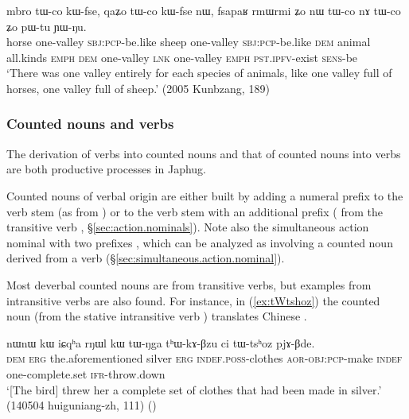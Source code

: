  \begin{exe}
\ex \label{ex:mbro.tWco}
 \gll  mbro tɯ-co kɯ-fse, qaʑo tɯ-co kɯ-fse nɯ, fsapaʁ rmɯrmi ʑo nɯ tɯ-co nɤ tɯ-co ʑo pɯ-tu ɲɯ-ŋu. \\
 horse one-valley \textsc{sbj}:\textsc{pcp}-be.like  sheep one-valley \textsc{sbj}:\textsc{pcp}-be.like \textsc{dem} animal all.kinds \textsc{emph} \textsc{dem}  one-valley \textsc{lnk}  one-valley \textsc{emph} \textsc{pst}.\textsc{ipfv}-exist \textsc{sens}-be \\
 \glt `There was one valley entirely for each species of animals, like one valley full of horses, one valley full of sheep.' (2005 Kunbzang, 189)
 \end{exe}
 
\subsubsection{Counted nouns and verbs}   \label{sec:CN.verbs}
The derivation of verbs into counted nouns and that of counted nouns into verbs are both productive processes in Japhug. 

Counted nouns of verbal origin are either built by adding a numeral prefix to the verb stem (as  from ) or to the verb stem with an additional prefix  ( from the transitive verb , §\ref{sec:action.nominals}). Note also the simultaneous action nominal with two prefixes , which can be analyzed as involving a counted noun derived from a verb (§\ref{sec:simultaneous.action.nominal}). 

Most deverbal counted nouns are from transitive verbs, but examples from intransitive verbs are also found. For instance, in (\ref{ex:tWtshoz}) the counted noun  (from the stative intransitive verb ) translates Chinese .

\begin{exe}
\ex \label{ex:tWtshoz}
\gll nɯnɯ kɯ iɕqʰa rŋɯl kɯ tɯ-ŋga tʰɯ-kɤ-βzu ci tɯ-tsʰoz pjɤ-βde. \\
\textsc{dem} \textsc{erg} the.aforementioned silver \textsc{erg} \textsc{indef}.\textsc{poss}-clothes \textsc{aor}-\textsc{obj}:\textsc{pcp}-make \textsc{indef} one-complete.set \textsc{ifr}-throw.down \\
\glt `[The bird] threw her a complete set of clothes that had been made in silver.'  (140504 huiguniang-zh, 111)
()
\end{exe}

